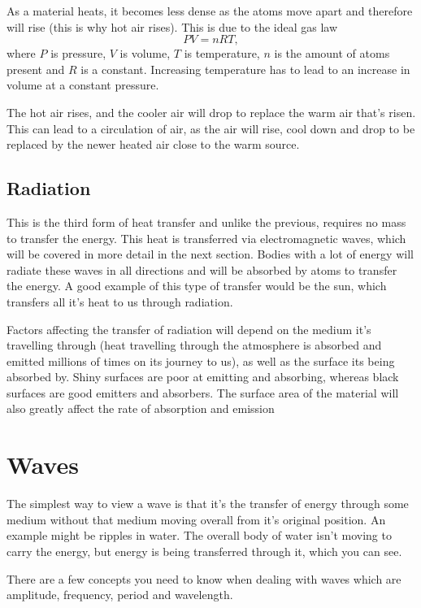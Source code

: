 \documentclass[11pt, titlepage]{article}
\begin{document}
As a material heats, it becomes less dense as the atoms move apart and therefore will rise (this is why hot air rises).  This is due to the ideal gas law
\begin{equation}
PV = nRT,
\end{equation}
where $P$ is pressure, $V$ is volume, $T$ is temperature, $n$ is the amount of atoms present and $R$ is a constant.  Increasing temperature has to lead to an increase in volume at a constant pressure.

The hot air rises, and the cooler air will drop to replace the warm air that's risen.  This can lead to a circulation of air, as the air will rise, cool down and drop to be replaced by the newer heated air close to the warm source.


\subsection{Radiation}
This is the third form of heat transfer and unlike the previous, requires no mass to transfer the energy.  This heat is transferred via electromagnetic waves, which will be covered in more detail in the next section.  Bodies with a lot of energy will radiate these waves in all directions and will be absorbed by atoms to transfer the energy.  A good example of this type of transfer would be the sun, which transfers all it's heat to us through radiation.

Factors affecting the transfer of radiation will depend on the medium it's travelling through (heat travelling through the atmosphere is absorbed and emitted millions of times on its journey to us), as well as the surface its being absorbed by.  Shiny surfaces are poor at emitting and absorbing, whereas black surfaces are good emitters and absorbers.  The surface area of the material will also greatly affect the rate of absorption and emission




\section{Waves}
The simplest way to view a wave is that it's the transfer of energy through some medium without that medium moving overall from it's original position.  An example might be ripples in water.  The overall body of water isn't moving to carry the energy, but energy is being transferred through it, which you can see.

There are a few concepts you need to know when dealing with waves which are amplitude, frequency, period and wavelength.
\end{document}
